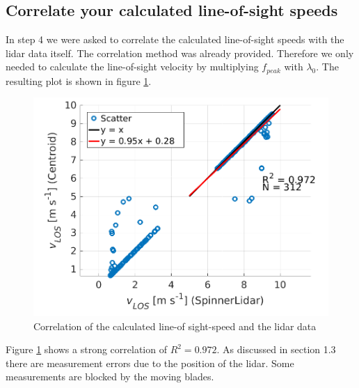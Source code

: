 \documentclass[10pt]{article}
\begin{document}
\subsection{Correlate your calculated line-of-sight speeds}
In step 4 we were asked to correlate the calculated line-of-sight speeds with the lidar data itself. The correlation method was already provided. Therefore we only needed to calculate the line-of-sight velocity by multiplying $f_{peak}$ with $\lambda_0$. The resulting plot is shown in figure \ref{fig:correlation}. 

\begin{figure}[H]
\includegraphics[width=1\linewidth]{../Exercises_and_Tasks/ex1/figures/correlation.png}
\caption{Correlation of the calculated line-of sight-speed and the lidar data}
\label{fig:correlation}
\end{figure}

Figure \ref{fig:correlation} shows a strong correlation of $R^2 = 0.972$. As discussed in section 1.3 there are measurement errors due to the position of the lidar. Some measurements are blocked by the moving blades. 
\end{document}
